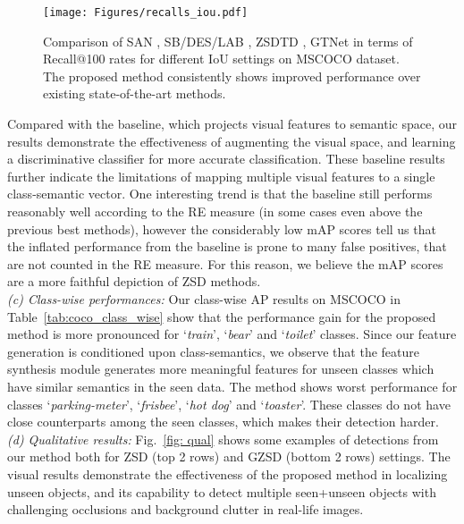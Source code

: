 \documentclass[runningheads]{llncs}
\begin{document}
\begin{figure}[tp]
    \centering
    \texttt{[image: Figures/recalls\_iou.pdf]}
    \caption{Comparison of SAN \cite{rahman2018zero}, SB/DES/LAB \cite{bansal2018zero}, ZSDTD \cite{li2019zero}, GTNet \cite{zhao2020gtnet} in terms of Recall@100 rates for different IoU settings on MSCOCO dataset. The proposed method consistently shows improved performance over existing state-of-the-art methods.}
    \label{fig:iou_coco}
\end{figure}


Compared with the baseline, which projects visual features to semantic space, our results demonstrate the effectiveness of augmenting the visual space, and learning a discriminative classifier for more accurate classification. These baseline results further indicate the limitations of mapping multiple visual features to a single class-semantic vector.  One interesting trend is that the baseline still performs reasonably well according to the RE measure (in some cases even above the previous best methods), however the considerably low mAP scores tell us that the inflated performance from the baseline is prone to many false positives, that are not counted in the RE measure. For this reason, we believe the mAP scores are a more faithful depiction of ZSD methods.\\


\noindent\emph{(c) Class-wise performances:} Our class-wise AP results on MSCOCO in Table~\ref{tab:coco_class_wise} show that the performance gain for the proposed method is more pronounced for `\emph{train}', `\emph{bear}' and `\emph{toilet}' classes. Since our feature generation is conditioned upon class-semantics, we observe that the feature synthesis module generates more meaningful features for unseen classes which have similar semantics in the seen data. The method shows worst performance for classes `\emph{parking-meter}', `\emph{frisbee}', `\emph{hot dog}' and `\emph{toaster}'. These classes do not have close counterparts among the seen classes, which makes their detection harder. \\ 




\noindent\emph{(d) Qualitative results:} Fig.~\ref{fig: qual} shows some examples of detections from our method both for ZSD (top 2 rows) and GZSD (bottom 2 rows) settings. The visual results demonstrate the effectiveness of the proposed method in localizing unseen objects, and its capability to detect multiple seen+unseen objects with challenging occlusions and background clutter in real-life images.
\end{document}
